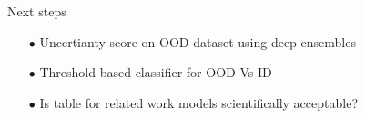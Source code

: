 \documentclass[aspectratio=169]{beamer}
\newcommand{\cmark}{\ding{51}}%
\newcommand{\done}{\rlap{$\square$}{\raisebox{2pt}{\large\hspace{1pt}\cmark}}%
\hspace{-2.5pt}}
\begin{document}
\begin{frame}{Next steps}
    \begin{itemize}
        \item[$\bullet$] Uncertianty score on OOD dataset using deep ensembles
        \item[$\bullet$] Threshold based classifier for OOD Vs ID
        \item[$\bullet$] Is table for related work models scientifically acceptable?  
    \end{itemize}
\end{frame}
\end{document}
